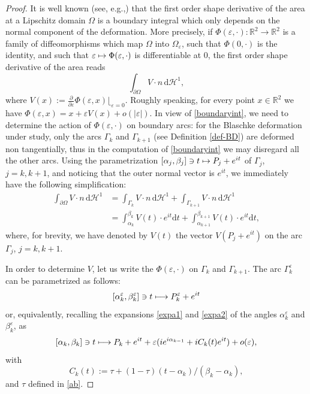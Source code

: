 \documentclass[11pt]{article}
\newcommand{\eg}{e.g.,\xspace}
\numberwithin{equation}{section}
\let\mathcal\mathscr
\newcommand\mto{\mathchoice{\longmapsto}{\mapsto}{\mapsto}{\mapsto}}
\let\epsilon\varepsilon
\theoremstyle{plain}
\theoremstyle{definition}
\newcommand\de{\mathrm{d}}\let\dr\de
\let \e\epsilon
\let\B\Gamma
\begin{document}
\begin{proof}
It is well known (see, \eg \cite{HP}) that the first order shape derivative of the area at a Lipschitz domain $\Omega$ is a boundary integral which only depends on the normal component of the deformation.
More precisely, {if $\Phi(\e,\cdot):\mathbb R^2 \to \mathbb R^2$ is a family of diffeomorphisms which map $\Omega$ into $\Omega_\e$, such that $\Phi(0,\cdot)$ is the identity, and such that $\e \mto \Phi(\e, \cdot)$ is differentiable at $0$, the first order shape derivative of the area} reads
\begin{equation}\label{boundaryint}
\int_{\partial \Omega} V\cdot n \, \de \mathcal H^1,
\end{equation}
where {$V(x):=\frac{\partial}{\partial \e}\Phi(\e, x)\lfloor_{\e=0}$. Roughly speaking, for every point $x\in \mathbb R^2$ we have $\Phi(\e,x)=x + \e V(x) + o(|\e|)$. In view of \eqref{boundaryint}, we need to determine the action of $\Phi(\e,\cdot)$ on boundary arcs: for} the Blaschke deformation under study, {only the arcs} $\B_k$ and $\B_{k+1}$ (see Definition \ref{def-BD}) {are deformed non tangentially, thus in the computation of \eqref{boundaryint} we may disregard all the other arcs.} Using the parametrization $[\alpha_j, \beta_j]\ni t\mto P_j + e^{it}$ of $\B_j$, $j=k, k+1$, and noticing that the outer normal vector is $e^{it}$, we immediately have the following simplification:
\begin{equation}\label{shapeder}
\begin{split}
\int_{\partial \Omega} V\cdot n \, \de \mathcal H^1 &= \int_{\B_k} V \cdot n \, \de \mathcal H^1 + \int_{\B_{k+1}}V\cdot n \, \de \mathcal H^1\\
&= \int_{\alpha_k}^{\beta_k} V(t) \cdot e^{it} \de t+ \int_{\alpha_{k+1}}^{\beta_{k+1}} V(t)\cdot e^{it}\de t,
\end{split}
\end{equation}
where, for brevity, we have denoted by $V(t)$ the vector $V(P_j + e^{it})$ on the arc $\B_j$, $j=k, k+1$.

{In order to determine $V$, let us write the $\Phi(\e,\cdot)$ on $\B_{k}$ and $\B_{k+1}$. The arc $\B_{k}^\e$ can be parametrized as follows:
\[
[\alpha_k^\e,\beta_k^\e] \ni t \mto P_k^\e + e^{it}
\]
}
or, equivalently, recalling the expansions \eqref{expa1} and \eqref{expa2} of the angles $\alpha_k^\e$ and $\beta_k^\e$, as
{
\[
[\alpha_k,\beta_k] \ni t \mto P_k + e^{it} + \e ( i e^{i\alpha_{k-1}} + i C_k(t)e^{it}) + o(\e),
\]
}
with
\[
C_k(t):= \tau+ (1-\tau)(t-\alpha_k)/(\beta_k-\alpha_k),
\]
and $\tau$ defined in \eqref{ab}.


\end{proof}
\end{document}
